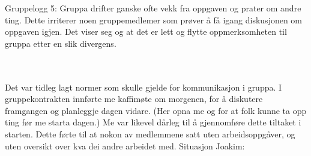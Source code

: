 Gruppelogg 5:
Gruppa drifter ganske ofte vekk fra oppgaven og prater om andre ting. Dette irriterer
noen gruppemedlemer som prøver å få igang diskusjonen om oppgaven igjen. Det viser seg
og at det er lett og flytte oppmerksomheten til gruppa etter en slik divergens.



\\
\\ 
Det var tidleg lagt normer som skulle gjelde for kommunikasjon i gruppa. I gruppekontrakten innførte me kaffimøte om morgenen, for å diskutere framgangen og planleggje dagen vidare. (Her opna me og for at folk kunne ta opp ting før me starta dagen.) Me var likevel dårleg til å gjennomføre dette tiltaket i starten. Dette førte til at nokon av medlemmene satt uten arbeidsoppgåver, og uten oversikt over kva dei andre arbeidet med. 
Situasjon Joakim:

